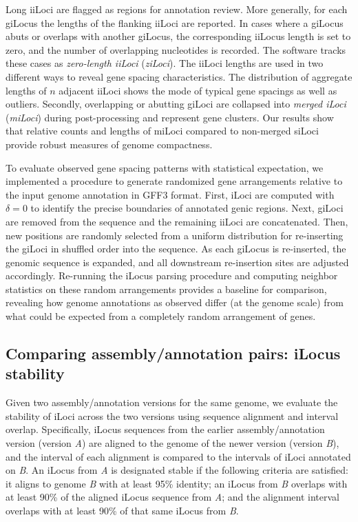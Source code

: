 Long iiLoci are flagged as regions for annotation review.
More generally, for each giLocus the lengths of the flanking iiLoci are reported.
In cases where a giLocus abuts or overlaps with another giLocus, the corresponding iiLocus length is set to zero, and the number of overlapping nucleotides is recorded.
The software tracks these cases as \textit{zero-length iiLoci} (\textit{ziLoci}).
The iiLoci lengths are used in two different ways to reveal gene spacing characteristics.
The distribution of aggregate lengths of $n$ adjacent iiLoci shows the mode of typical gene spacings as well as outliers.
Secondly, overlapping or abutting giLoci are collapsed into \textit{merged iLoci} (\textit{miLoci}) during post-processing and represent gene clusters.
Our results show that relative counts and lengths of miLoci compared to non-merged siLoci provide robust measures of genome compactness.

To evaluate observed gene spacing patterns with statistical expectation, we implemented a procedure to generate randomized gene arrangements relative to the input genome annotation in GFF3 format.
First, iLoci are computed with $\delta=0$ to identify the precise boundaries of annotated genic regions.
Next, giLoci are removed from the sequence and the remaining iiLoci are concatenated.
Then, new positions are randomly selected from a uniform distribution for re-inserting the giLoci in shuffled order into the sequence.
As each giLocus is re-inserted, the genomic sequence is expanded, and all downstream re-insertion sites are adjusted accordingly.
Re-running the iLocus parsing procedure and computing neighbor statistics on these random arrangements provides a baseline for comparison, revealing how genome annotations as observed differ (at the genome scale) from what could be expected from a completely random arrangement of genes.


\subsection{Comparing assembly/annotation pairs: iLocus stability}
Given two assembly/annotation versions for the same genome, we evaluate the stability of iLoci across the two versions using sequence alignment and interval overlap.
Specifically, iLocus sequences from the earlier assembly/annotation version (version \textit{A}) are aligned to the genome of the newer version (version \textit{B}), and the interval of each alignment is compared to the intervals of iLoci annotated on \textit{B}.
An iLocus from \textit{A} is designated stable if the following criteria are satisfied: it aligns to genome \textit{B} with at least 95\% identity; an iLocus from \textit{B} overlaps with at least 90\% of the aligned iLocus sequence from \textit{A}; and the alignment interval overlaps with at least 90\% of that same iLocus from \textit{B}.


